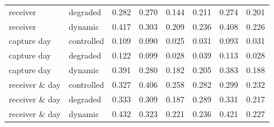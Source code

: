\begin{table}[!htbp]
\begin{tabular}{llrrrrrr}
receiver & degraded & 0.282 & 0.270 & 0.144 & 0.211 & 0.274 & 0.201 \\
receiver & dynamic & 0.417 & 0.303 & 0.209 & 0.236 & 0.408 & 0.226 \\
capture day & controlled & 0.109 & 0.090 & 0.025 & 0.031 & 0.093 & 0.031 \\
capture day & degraded & 0.122 & 0.099 & 0.028 & 0.039 & 0.113 & 0.028 \\
capture day & dynamic & 0.391 & 0.280 & 0.182 & 0.205 & 0.383 & 0.188 \\
receiver \& day & controlled & 0.327 & 0.406 & 0.258 & 0.282 & 0.299 & 0.232 \\
receiver \& day & degraded & 0.333 & 0.309 & 0.187 & 0.289 & 0.331 & 0.217 \\
receiver \& day & dynamic & 0.432 & 0.323 & 0.221 & 0.236 & 0.421 & 0.227 \\
\bottomrule
\end{tabular}
\end{table}
